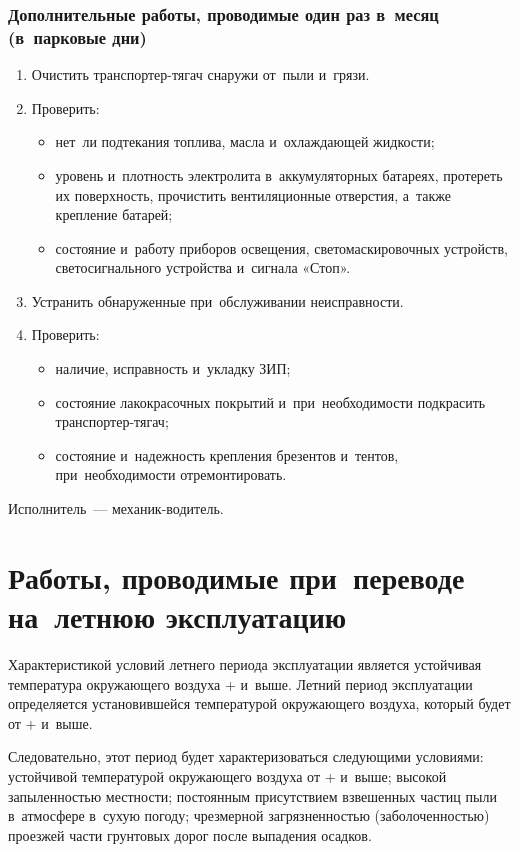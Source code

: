 \subsubsection{Дополнительные работы, проводимые один раз в~месяц (в~парковые дни)}
\begin{enumerate}
    \item Очистить транспортер-тягач снаружи от~пыли и~грязи. 
    \item Проверить: 
        \begin{itemize}
            \item нет~ли подтекания топлива, масла и~охлаждающей жидкости;
            \item уровень и~плотность электролита в~аккумуляторных батареях, протереть их поверхность, прочистить вентиляционные отверстия, а~также крепление батарей; 
            \item состояние и~работу приборов освещения, светомаскировочных устройств, светосигнального устройства и~сигнала «Стоп». 
        \end{itemize}
    \item Устранить обнаруженные при~обслуживании неисправности. 
    \item Проверить: 
    \begin{itemize}
        \item наличие, исправность и~укладку ЗИП;
        \item состояние лакокрасочных покрытий и~при~необходимости подкрасить транспортер-тягач; 
        \item состояние и~надежность крепления брезентов и~тентов, при~необходимости отремонтировать. 
    \end{itemize} 

\end{enumerate}
Исполнитель~--- механик-водитель.

\section{Работы, проводимые при~переводе на~летнюю эксплуатацию}
Характеристикой условий летнего периода эксплуатации является устойчивая температура окружающего воздуха + и~выше. Летний период эксплуатации определяется установившейся температурой окружающего воздуха, который будет от + и~выше.

Следовательно, этот период будет характеризоваться следующими условиями: устойчивой температурой окружающего воздуха от + и~выше; высокой запыленностью местности; постоянным присутствием взвешенных частиц пыли в~атмосфере в~сухую погоду; чрезмерной загрязненностью (заболоченностью) проезжей части грунтовых дорог после выпадения осадков.

